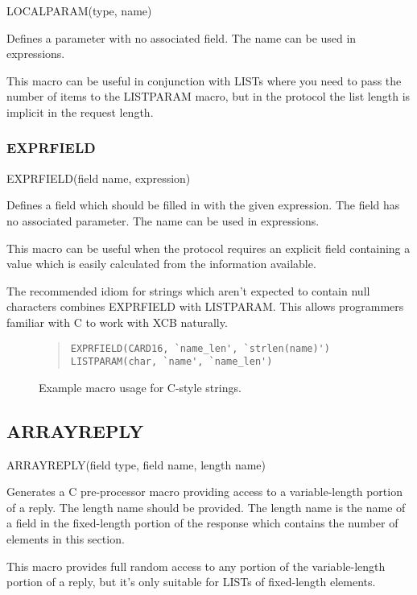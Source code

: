 \documentclass{article}
\begin{document}
LOCALPARAM(type, name)

Defines a parameter with no associated field. The name can be used
in expressions.

This macro can be useful in conjunction with LISTs where you need to
pass the number of items to the LISTPARAM macro, but in the protocol
the list length is implicit in the request length.


\subsubsection{EXPRFIELD}

EXPRFIELD(field name, expression)

Defines a field which should be filled in with the given expression.
The field has no associated parameter. The name can be used in
expressions.

This macro can be useful when the protocol requires an explicit
field containing a value which is easily calculated from the
information available.

The recommended idiom for strings which aren't expected to contain
null characters combines EXPRFIELD with LISTPARAM. This allows
programmers familiar with C to work with XCB naturally.

\begin{figure}
\begin{quote}\begin{verbatim}
EXPRFIELD(CARD16, `name_len', `strlen(name)')
LISTPARAM(char, `name', `name_len')
\end{verbatim}\end{quote}
\caption{Example macro usage for C-style strings.}\label{fig-string}
\end{figure}


\subsection{ARRAYREPLY}

ARRAYREPLY(field type, field name, length name)

Generates a C pre-processor macro providing access to a variable-length
portion of a reply. The length name should be provided. The length name
is the name of a field in the fixed-length portion of the response which
contains the number of elements in this section.

This macro provides full random access to any portion of the
variable-length portion of a reply, but it's only suitable for LISTs of
fixed-length elements.
\end{document}
